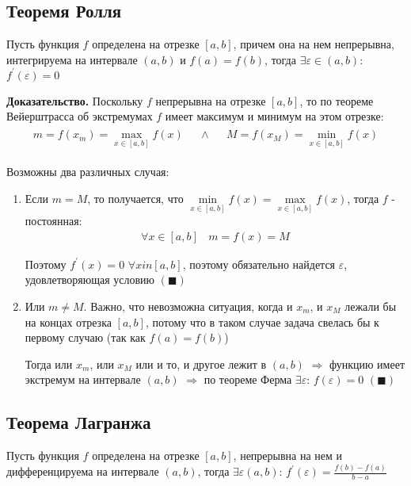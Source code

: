 \documentclass[class=article,a4paper,12pt,crop=false]{standalone}
\begin{document}
\subsection{Теоремя Ролля}

Пусть функция $f$ определена на отрезке $[a, b]$, причем она на нем непрерывна,
интегрируема на интервале $(a, b)$ и $f(a) = f(b)$, тогда $\exists \varepsilon \in (a, b)$: $f^{'}(\varepsilon) = 0$

\textbf{Доказательство.} Поскольку $f$ непрерывна на отрезке $[a, b]$, то по теореме Вейерштрасса об
экстремумах $f$ имеет максимум и минимум на этом отрезке:
\begin{eqnarray}
    \begin{aligned}
        m = f(x_m) = \underset{x \in [a, b]}{\max}f(x) & & \land & &
        M = f(x_M) = \underset{x \in [a, b]}{\min}f(x)
    \end{aligned}
\end{eqnarray}

Возможны два различных случая:
\begin{enumerate}
    \item {
        Если $m = M$, то получается, что $\underset{x \in [a, b]}{\min}f(x) = \underset{x \in [a, b]}{\max}f(x)$,
        тогда $f$ - постоянная:
        \begin{eqnarray}
            \forall x \in [a, b] \:\:\:\: m = f(x) = M
        \end{eqnarray}

        Поэтому $f^{'}(x) = 0$ $\forall x in [a, b]$, поэтому обязательно найдется
        $\varepsilon$, удовлетворяющая условию $(\blacksquare)$
    }
    \item {
        Или $m \neq M$. Важно, что невозможна ситуация, когда и $x_m$, и $x_M$ лежали бы
        на концах отрезка $[a, b]$, потому что в таком случае задача свелась бы к первому
        случаю (так как $f(a) = f(b)$)

        Тогда или $x_m$, или $x_M$ или и то, и другое лежит в $(a, b)$ $\Rightarrow$
        функцию имеет экстремум на интервале $(a, b) $ $\Rightarrow$ по теореме
        Ферма $\exists \varepsilon$: $f(\varepsilon) = 0$ $(\blacksquare)$
    }
\end{enumerate}

\subsection{Теорема Лагранжа}

Пусть функция $f$ определена на отрезке $[a, b]$, непрерывна на нем и дифференцируема
на интервале $(a, b)$, тогда $\exists \varepsilon (a, b)$: $f^{'}(\varepsilon) = \frac{f(b) - f(a)}{b - a}$
\end{document}
